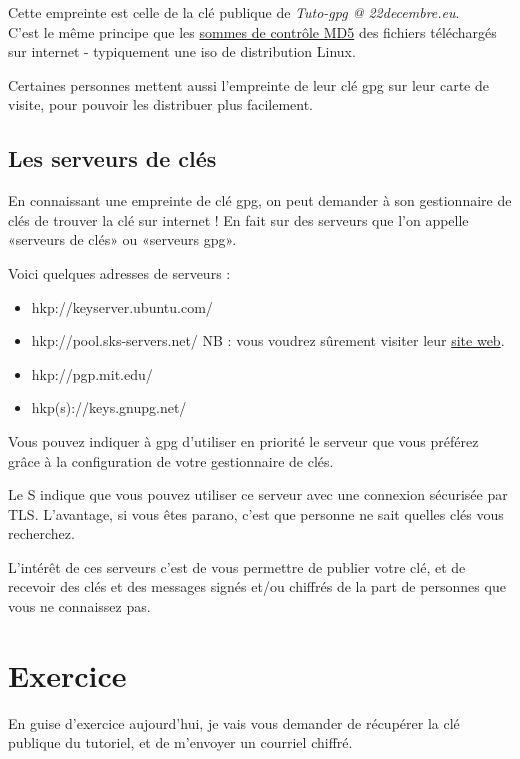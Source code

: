 Cette empreinte est celle de la clé publique de \emph{Tuto-gpg @
22decembre.eu}.\\C'est le même principe que les
\href{http://fr.wikipedia.org/wiki/MD5}{sommes de contrôle MD5} des
fichiers téléchargés sur internet - typiquement une iso de distribution
Linux.

Certaines personnes mettent aussi l'empreinte de leur clé gpg sur leur
carte de visite, pour pouvoir les distribuer plus facilement.

\subsection{Les serveurs de clés}\label{les-serveurs-de-cluxe9s}

En connaissant une empreinte de clé gpg, on peut demander à son
gestionnaire de clés de trouver la clé sur internet ! En fait sur des
serveurs que l'on appelle «serveurs de clés» ou «serveurs gpg».

Voici quelques adresses de serveurs :

\begin{itemize}
\itemsep1pt\parskip0pt
\item
  hkp://keyserver.ubuntu.com/
\item
  hkp://pool.sks-servers.net/ NB : vous voudrez sûrement visiter leur
  \href{https://sks-keyservers.net/i/}{site web}.
\item
  hkp://pgp.mit.edu/
\item
  hkp(s)://keys.gnupg.net/
\end{itemize}

Vous pouvez indiquer à gpg d'utiliser en priorité le serveur que vous
préférez grâce à la configuration de votre gestionnaire de clés.

Le S indique que vous pouvez utiliser ce serveur avec une connexion
sécurisée par TLS. L'avantage, si vous êtes parano, c'est que personne
ne sait quelles clés vous recherchez.

L'intérêt de ces serveurs c'est de vous permettre de publier votre clé,
et de recevoir des clés et des messages signés et/ou chiffrés de la part
de personnes que vous ne connaissez pas.

\section{Exercice}\label{exercice}

En guise d'exercice aujourd'hui, je vais vous demander de récupérer la
clé publique du tutoriel, et de m'envoyer un courriel chiffré.

